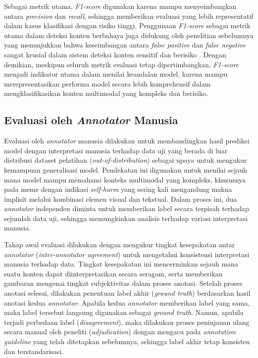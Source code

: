 Sebagai metrik utama, \textit{F1-score} digunakan karena mampu menyeimbangkan antara \textit{precision} dan \textit{recall}, sehingga memberikan evaluasi yang lebih representatif dalam kasus klasifikasi dengan risiko tinggi. Penggunaan \textit{F1-score} sebagai metrik utama dalam deteksi konten berbahaya juga didukung oleh penelitian sebelumnya yang menunjukkan bahwa keseimbangan antara \textit{false positive} dan \textit{false negative} sangat krusial dalam sistem deteksi konten sensitif dan berisiko \cite{Sokolova2009Performance} \cite{Sharma2022HarmfulMemes}. Dengan demikian, meskipun seluruh metrik evaluasi tetap dipertimbangkan, \textit{F1-score} menjadi indikator utama dalam menilai keandalan model, karena mampu merepresentasikan performa model secara lebih komprehensif dalam mengklasifikasikan konten multimodal yang kompleks dan berisiko.


\subsection{Evaluasi oleh \textit{Annotator} Manusia} \label{subsec:evaluasi_annotator_manusia}
Evaluasi oleh \textit{annotator} manusia dilakukan untuk membandingkan hasil prediksi model dengan interpretasi manusia terhadap data uji yang berada di luar distribusi dataset pelatihan (\textit{out-of-distribution}) sebagai upaya untuk mengukur kemampuan generalisasi model. Pendekatan ini digunakan untuk menilai sejauh mana model mampu memahami konteks multimodal yang kompleks, khususnya pada meme dengan indikasi \textit{self-harm} yang sering kali mengandung makna implisit melalui kombinasi elemen visual dan tekstual. Dalam proses ini, dua \textit{annotator} independen diminta untuk memberikan label secara terpisah terhadap sejumlah data uji, sehingga memungkinkan analisis terhadap variasi interpretasi manusia.

Tahap awal evaluasi dilakukan dengan mengukur tingkat kesepakatan antar \textit{annotator} (\textit{inter-annotator agreement}) untuk mengetahui konsistensi interpretasi manusia terhadap data. Tingkat kesepakatan ini mencerminkan sejauh mana suatu konten dapat diinterpretasikan secara seragam, serta memberikan gambaran mengenai tingkat subjektivitas dalam proses anotasi. Setelah proses anotasi selesai, dilakukan penentuan label akhir (\textit{ground truth}) berdasarkan hasil anotasi kedua \textit{annotator}. Apabila kedua \textit{annotator} memberikan label yang sama, maka label tersebut langsung digunakan sebagai \textit{ground truth}. Namun, apabila terjadi perbedaan label (\textit{disagreement}), maka dilakukan proses peninjauan ulang secara manual oleh peneliti (\textit{adjudication}) dengan mengacu pada \textit{annotation guideline} yang telah ditetapkan sebelumnya, sehingga label akhir tetap konsisten dan terstandarisasi.

